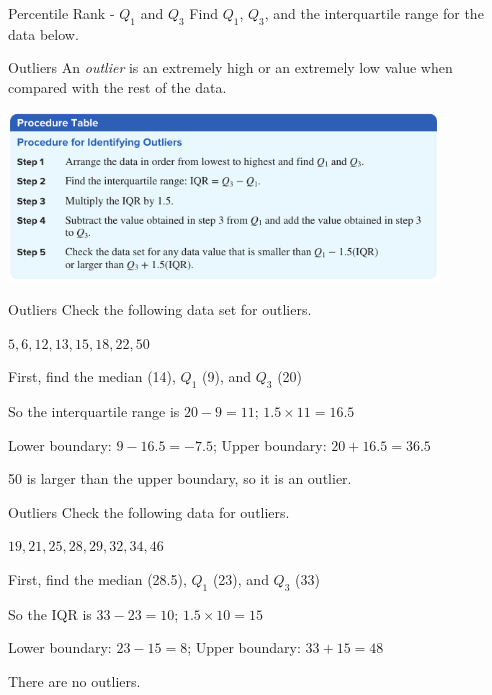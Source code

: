 \documentclass[t, aspectratio=169]{beamer}
\newcommand{\?}{\stackrel{?}{=}}
\begin{document}
	\begin{frame}{Percentile Rank - $Q_1$ and $Q_3$}
		Find $Q_1$, $Q_3$, and the interquartile range for the data below.
		
		 \vspace{12pt}
		
		
		
		
	\end{frame}

	\begin{frame}{Outliers}
		An \textit{outlier} is an extremely high or an extremely low value when compared with the rest of the data.
		
		\includegraphics[width=4.5in]{outlier-proc.png}
	\end{frame}

	\begin{frame}{Outliers}
		Check the following data set for outliers.
		
		$5, 6, 12, 13, 15, 18, 22, 50$ \pause
		
		First, find the median (14), $Q_1$ (9), and $Q_3$ (20) \pause
		
		So the interquartile range is $20 - 9 = 11$; $1.5 \times 11 = 16.5$ \pause
		
		Lower boundary: $9 - 16.5 = -7.5$; Upper boundary: $20 + 16.5 = 36.5$ \pause
		
		50 is larger than the upper boundary, so it is an outlier.
	\end{frame}

	\begin{frame}{Outliers}
		Check the following data for outliers.
		
		$19, 21, 25, 28, 29, 32, 34, 46$ \pause
		
		First, find the median (28.5), $Q_1$ (23), and $Q_3$ (33) \pause
		
		So the IQR is $33 - 23 = 10$; $1.5 \times 10 = 15$ \pause
		
		Lower boundary: $23 - 15 = 8$; Upper boundary: $33 + 15 = 48$ \pause
		
		There are no outliers.
	\end{frame}
\end{document}
